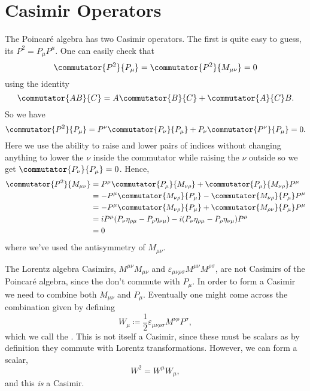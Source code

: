 \documentclass[fleqn]{NotesClass}
\newcommand{\minkowskiMetric}{\eta}
\begin{document}
    \section{Casimir Operators}
    The Poincar\'e algebra has two Casimir operators.
    The first is quite easy to guess, its \(P^2 = P_\mu P^\mu\).
    One can easily check that
    \begin{equation}
        \commutator{P^2}{P_\mu} = \commutator{P^2}{M_{\mu\nu}} = 0
    \end{equation}
    using the identity
    \begin{equation}
        \commutator{AB}{C} = A\commutator{B}{C} + \commutator{A}{C}B.
    \end{equation}
    So we have
    \begin{equation}
        \commutator{P^2}{P_\mu} = P^\nu\commutator{P_\nu}{P_\mu} + P_\nu\commutator{P^\nu}{P_\mu} = 0.
    \end{equation}
    Here we use the ability to raise and lower pairs of indices without changing anything to lower the \(\nu\) inside the commutator while raising the \(\nu\) outside so we get \(\commutator{P_\nu}{P_\mu} = 0\).
    Hence,
    \begin{align}
        \commutator{P^2}{M_{\mu\nu}} &= P^\mu\commutator{P_\mu}{M_{\nu\rho}} + \commutator{P_\mu}{M_{\nu\rho}}P^\mu\\
        &= -P^\mu\commutator{M_{\nu\rho}}{P_\mu} - \commutator{M_{\nu\rho}}{P_\mu}P^\mu\\
        &= -P^\mu\commutator{M_{\nu\rho}}{P_\mu} + \commutator{M_{\rho\nu}}{P_\mu}P^\mu\\
        &= iP^\mu(P_\nu \minkowskiMetric_{\rho\mu} - P_\rho \minkowskiMetric_{\nu\mu}) - i(P_\nu \minkowskiMetric_{\rho\mu} - P_\rho \minkowskiMetric_{\nu\mu})P^\mu\\
        &= 0
    \end{align}
    where we've used the antisymmetry of \(M_{\mu\nu}\).
    
    The Lorentz algebra Casimirs, \(M^{\mu\nu}M_{\mu\nu}\) and \(\varepsilon_{\mu\nu\rho\sigma}M^{\mu\nu}M^{\rho\sigma}\), are not Casimirs of the Poincar\'e algebra, since the don't commute with \(P_\mu\).
    In order to form a Casimir we need to combine both \(M_{\mu\nu}\) and \(P_\mu\).
    Eventually one might come across the combination given by defining
    \begin{equation}
        W_\mu \coloneqq \frac{1}{2}\varepsilon_{\mu\nu\rho\sigma}M^{\nu\rho}P^\sigma,
    \end{equation}
    which we call the .
    This is not itself a Casimir, since these must be scalars as by definition they commute with Lorentz transformations.
    However, we can form a scalar,
    \begin{equation}
        W^2 = W^\mu W_\mu,
    \end{equation}
    and this \emph{is} a Casimir.
    
\end{document}
